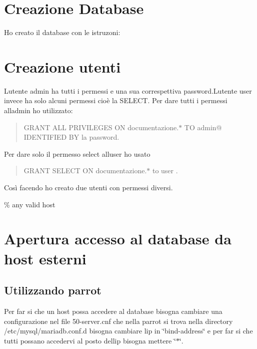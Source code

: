 \section*{Creazione Database}

Ho creato il database con le istruzoni\+: 
\begin{DoxyCode}{0}
\end{DoxyCode}


\section*{Creazione utenti}

L\textquotesingle{}utente admin ha tutti i permessi e una sua correspettiva password.\+L\textquotesingle{}utente user invece ha solo alcuni permessi cioè la S\+E\+L\+E\+CT. Per dare tutti i permessi all\textquotesingle{}admin ho utilizzato\+: \begin{quote}
G\+R\+A\+NT A\+LL P\+R\+I\+V\+I\+L\+E\+G\+ES ON documentazione.$\ast$ TO admin@\textquotesingle{}\textquotesingle{} I\+D\+E\+N\+T\+I\+F\+I\+ED BY \textquotesingle{}la password\textquotesingle{}. \end{quote}


Per dare solo il permesso select all\textquotesingle{}user ho usato \begin{quote}
G\+R\+A\+NT S\+E\+L\+E\+CT ON documentazione.$\ast$ to user . \end{quote}


Così facendo ho creato due utenti con permessi diversi.

\% any valid host

\section*{Apertura accesso al database da host esterni}

\subsection*{Utilizzando parrot}

Per far si che un host possa accedere al database bisogna cambiare una configurazione nel file 50-\/server.\+cnf che nella parrot si trova nella directory /etc/mysql/mariadb.conf.\+d bisogna cambiare l\textquotesingle{}ip in \char`\"{}bind-\/address\char`\"{} e per far si che tutti possano accedervi al posto dell\textquotesingle{}ip bisogna mettere \char`\"{}$\ast$\char`\"{}. 
\begin{DoxyCode}{0}
\end{DoxyCode}
